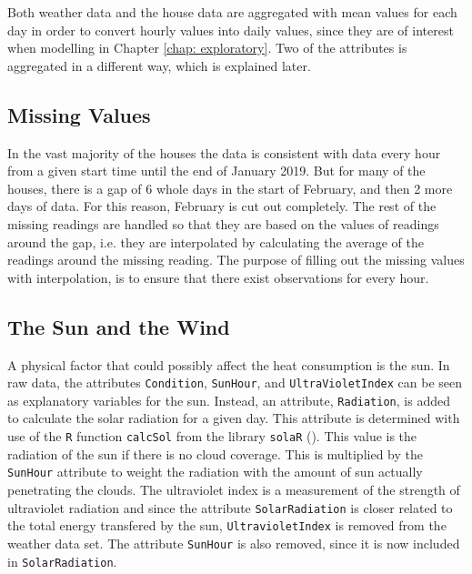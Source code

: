\noindent Both weather data and the house data are aggregated with mean values for each day in order to convert hourly values into daily values, since they are of interest when modelling in Chapter \ref{chap: exploratory}. Two of the attributes is aggregated in a different way, which is explained later.


\subsection{Missing Values}
In the vast majority of the houses the data is consistent with data every hour from a given start time until the end of January 2019. But for many of the houses, there is a gap of 6 whole days in the start of February, and then 2 more days of data. For this reason, February is cut out completely. The rest of the missing readings are handled so that they are based on the values of readings around the gap, i.e. they are interpolated by calculating the average of the readings around the missing reading.
The purpose of filling out the missing values with interpolation, is to ensure that there exist observations for every hour.


\subsection{The Sun and the Wind}
\noindent A physical factor that could possibly affect the heat consumption is the sun. In raw data, the attributes \texttt{Condition}, \texttt{SunHour},  and \texttt{UltraVioletIndex} can be seen as explanatory variables for the sun. Instead, an attribute, \texttt{Radiation}, is added to calculate the solar radiation for a given day. This attribute is determined with use of the \texttt{R} function \texttt{calcSol} from the library \texttt{solaR} (\cite{solaR}). This value is the radiation of the sun if there is no cloud coverage. This is multiplied by the \texttt{SunHour} attribute to weight the radiation with the amount of sun actually penetrating the clouds. The ultraviolet index is a measurement of the strength of ultraviolet radiation and since the attribute \texttt{SolarRadiation} is closer related to the total energy transfered by the sun, \texttt{UltravioletIndex} is removed from the weather data set. The attribute \texttt{SunHour} is also removed, since it is now included in \texttt{SolarRadiation}.

